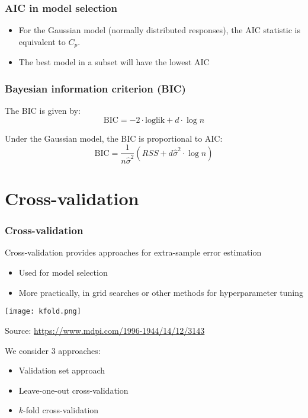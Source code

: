 \documentclass[smaller]{beamer}
\newcommand{\lt}{\left}
\newcommand{\rt}{\right}
\newcommand{\?}{\stackrel{?}{=}}
\newcommand{\fr}{\frac}
\begin{document}
\begin{frame}
  \frametitle{AIC in model selection}
  \pause
  \begin{itemize}[<+->]
  \item For the Gaussian model (normally distributed responses), the AIC statistic is equivalent to $C_p$.
  \item The best model in a subset will have the lowest AIC
  \end{itemize}
\end{frame}
\begin{frame}
  \frametitle{Bayesian information criterion (BIC)}
  The BIC is given by:\pause
  \begin{equation}
    \text{BIC} = -2 \cdot \text{loglik} + d \cdot \log n
  \end{equation}
  \pause
  
  Under the Gaussian model, the BIC is proportional to AIC:\pause
  \begin{equation}
    \label{eq:14}
    \text{BIC} = \fr{1}{n\hat\sigma^2}\lt(RSS + d\hat\sigma^2\cdot \log n\rt)
  \end{equation}
\end{frame}


\section{Cross-validation}

\begin{frame}
  \frametitle{Cross-validation}
  \pause

  Cross-validation provides approaches for extra-sample error estimation\pause
  \begin{itemize}
  \item Used for model selection
    \pause
  \item More practically, in grid searches or other methods for hyperparameter tuning
  \end{itemize}
  \pause


  \begin{center}
    \texttt{[image: kfold.png]}

    {\scriptsize Source: \url{https://www.mdpi.com/1996-1944/14/12/3143}}
  \end{center}

  \pause
  We consider 3 approaches:\pause
  \begin{itemize} 
  \item Validation set approach \pause
  \item Leave-one-out cross-validation\pause
  \item $k$-fold cross-validation 
  \end{itemize}
\end{frame}
\end{document}
